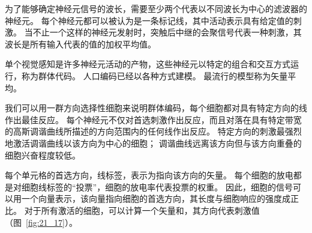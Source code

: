 为了能够确定神经元信号的波长，需要至少两个代表以不同波长为中心的滤波器的神经元。 
每个神经元都可以被认为是一条标记线，其中活动表示具有给定值的刺激。 
当不止一个这样的神经元发射时，突触后中继的会聚信号代表一种刺激，其波长是所有输入代表的值的加权平均值。


单个视觉感知是许多神经元活动的产物，这些神经元以特定的组合和交互方式运行，称为群体代码。 
人口编码已经以各种方式建模。 
最流行的模型称为矢量平均。


我们可以用一群方向选择性细胞来说明群体编码，每个细胞都对具有特定方向的线作出最佳反应。 
每个神经元不仅对首选刺激作出反应，而且对落在具有特定带宽的高斯调谐曲线所描述的方向范围内的任何线作出反应。 
特定方向的刺激最强烈地激活调谐曲线以该方向为中心的细胞； 
调谐曲线远离该方向但与该方向重叠的细胞兴奋程度较低。


每个单元格的首选方向，线标签，表示为指向该方向的矢量。 
每个细胞的放电都是对细胞线标签的“投票”，细胞的放电率代表投票的权重。 
因此，细胞的信号可以用一个向量表示，该向量指向细胞的首选方向，其长度与细胞响应的强度成正比。 
对于所有激活的细胞，可以计算一个矢量和，其方向代表刺激值（图~\ref{fig:21_17}）。


